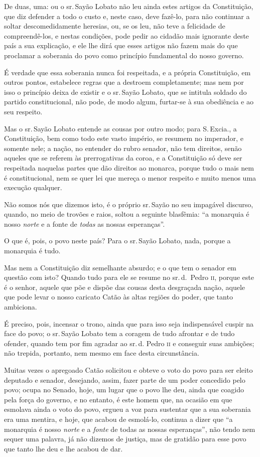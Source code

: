 De duas, uma: ou o sr.\,Sayão Lobato não leu ainda estes artigos da
Constituição, que diz defender a todo o custo e, neste caso, deve
fazê-lo, para não continuar a soltar descomedidamente heresias, ou, se
os leu, não teve a felicidade de compreendê-los, e nestas condições,
pode pedir ao cidadão mais ignorante deste país a sua explicação, e ele
lhe dirá que esses artigos não fazem mais do que proclamar a soberania
do povo como princípio fundamental do nosso governo.

É verdade que essa soberania nunca foi respeitada, e a própria
Constituição, em outros pontos, estabelece regras que a destroem
completamente; mas nem por isso o princípio deixa de existir e o sr.\,Sayão Lobato, que se intitula soldado do partido constitucional, não
pode, de modo algum, furtar-se à sua obediência e ao seu respeito.

Mas o sr.\,Sayão Lobato entende as cousas por outro modo; para S.\,Excia.,
a Constituição, bem como todo este vasto império, se resumem no
imperador, e somente nele; a nação, no entender do rubro senador, não
tem direitos, senão aqueles que se referem às prerrogativas da coroa, e
a Constituição só deve ser respeitada naquelas partes que dão direitos
ao monarca, porque tudo o mais nem é constitucional, nem se quer lei que
mereça o menor respeito e muito menos uma execução qualquer.

Não somos nós que dizemos isto, é o próprio sr.\,Sayão no seu impagável
discurso, quando, no meio de trovões e raios, soltou a seguinte
blasfêmia: ``a monarquia é nosso \emph{norte} e a fonte de \emph{todas}
as nossas esperanças''.

O que é, pois, o povo neste país? Para o sr.\,Sayão Lobato, nada, porque
a monarquia é tudo.

Mas nem a Constituição diz semelhante absurdo; e o que tem o senador em
questão com isto? Quando tudo para ele se resume no sr.\,d.~Pedro \textsc{ii},
porque este é o senhor, aquele que põe e dispõe das cousas desta
desgraçada nação, aquele que pode levar o nosso caricato Catão às altas
regiões do poder, que tanto ambiciona.

É preciso, pois, incensar o trono, ainda que para isso seja
indispensável cuspir na face do povo; o sr.\,Sayão Lobato tem a coragem
de tudo afrontar e de tudo ofender, quando tem por fim agradar ao sr.\,d.
Pedro \textsc{ii} e conseguir suas ambições; não trepida, portanto, nem mesmo em
face desta circunstância.

Muitas vezes o apregoado Catão solicitou e obteve o voto do povo para
ser eleito deputado e senador, desejando, assim, fazer parte de um poder
concedido pelo povo; ocupa no Senado, hoje, um lugar que o povo lhe deu,
ainda que coagido pela força do governo, e no entanto, é este homem que,
na ocasião em que esmolava ainda o voto do povo, ergueu a voz para
sustentar que a sua soberania era uma mentira, e hoje, que acabou de
esmolá-lo, continua a dizer que ``a monarquia é nosso \emph{norte} e a
\emph{fonte} de todas as nossas esperanças'', não tendo nem sequer uma
palavra, já não dizemos de justiça, mas de gratidão para esse povo que
tanto lhe deu e lhe acabou de dar.

